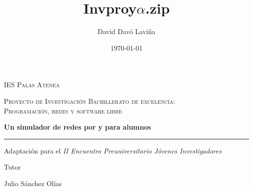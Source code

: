 \documentclass[a4paper, 11pt]{report} %
\title{Invproy\space $\alpha$.zip}
\author{David Davó Laviña}
\date{\today{}}
\begin{document}

\makeatletter
\begin{titlepage}{\fontsize{11}{14}
\centering
\vspace*{1cm}
{\sffamily\scshape\huge IES Palas Atenea \par}
\vspace{2cm}
{\sffamily\scshape\LARGE Proyecto de Investigación Bachillerato de excelencia:\\
Programación, redes y software libre\par}
\vspace{1.5cm}
{\sffamily\fontsize{42pt}{42pt}\bfseries\color{DarkRed} \@title\par}
{\sffamily\fontsize{24pt}{24pt}\bfseries Un simulador de redes por y para alumnos \par}
{\sffamily\color{DarkRed}\rule{0.5\textwidth}{1pt}\par}
\vspace{.3cm}
{\sffamily\small Adaptación para el \textit{II Encuentro Preuniversitario Jóvenes Investigadores}\par}
\vspace{1.6cm}
{\sffamily\LARGE\itshape \@author\par}
\vfill
{\sffamily\Large Tutor\par
Julio Sánchez Olías}

\vfill

{\sffamily\Large \@date\par}
\restoregeometry
}
\end{titlepage}
\clearpage




\renewcommand\cftchapfont{\bf\color{chaptercolour}}
\renewcommand\cftchappagefont{\bf\color{chaptercolour}}
\end{document}
